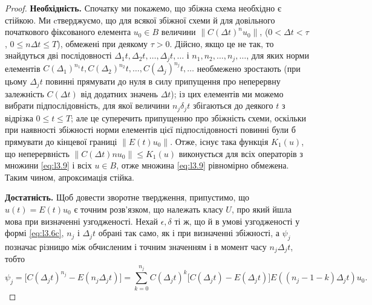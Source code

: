 \begin{proof}
    \textbf{Необхідність.} Спочатку ми покажемо, що збіжна схема необхідно є стійкою. Ми cтверджуємо, що для всякої збіжної схеми й для довільного початкового фіксованого елемента $u_0 \in B$ величини $\|C(\Delta t)^n u_0\|$, ($0 < \Delta t < \tau$, $0 \le n \Delta t \le T$), обмежені при деякому $\tau > 0$. Дійсно, якщо це не так, то знайдуться дві послідовності $\Delta_1 t, \Delta_2 t, \ldots, \Delta_j t, \ldots$ і $n_1, n_2, \ldots, n_j, \ldots$, для яких норми елементів $C(\Delta_1)^{n_1} t, C(\Delta_2)^{n_2} t, \ldots, C(\Delta_j)^{n_j} t, \ldots$ необмежено зростають (при цьому $\Delta_j t$ повинні прямувати до нуля в силу припущення про неперервну залежність $C(\Delta t)$ від додатних значень $\Delta t$); із цих елементів ми можемо вибрати підпослідовність, для якої величини $n_j \delta_j t$ збігаються до деякого $t$ з відрізка  $0 \le t \le T$; але це суперечить припущенню про збіжність схеми, оскільки при наявності збіжності норми елементів цієї підпослідовності повинні були б прямувати до кінцевої границі $\|E(t)u_0\|$. Отже, існує така функція $K_1(u)$, що неперервність $\|C(\Delta t) n u_0\| \le K_1(u)$ виконується для всіх операторів з множини \eqref{eq:l3.9} і всіх $u \in B$, отже множина \eqref{eq:l3.9} рівномірно обмежена. Таким чином, апроксимація стійка. \medskip

    \textbf{Достатність.} Щоб довести зворотне твердження, припустимо, що $u(t) = E(t)u_0$ є точним розв'язком, що належать класу $U$, про який йшла мова при визначенні узгодженості. Нехай  $\epsilon, \delta$ ті ж, що й в умові узгодженості у формі \eqref{eq:l3.6c}, $n_j$ і $\Delta_j t$ обрані так само, як і при визначенні збіжності, а $\psi_j$ позначає різницю між обчисленим і точним значенням і в момент часу  $n_j \Delta_j t$, тобто
    \begin{equation}
        \label{eq:l3.10}
        \psi_j = \Big[ C(\Delta_j t)^{n_j} - E(n_j \Delta_j t) \Big] = \sum_{k = 0}^{n_j} C(\Delta_j t)^k \Big[ C(\Delta_j t) - E(\Delta_j t) \Big] E((n_j - 1 - k) \Delta_j t) u_0.
    \end{equation}
    

\end{proof}
